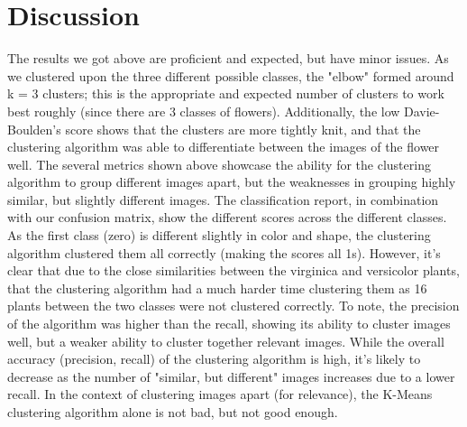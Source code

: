 \documentclass[10pt,twocolumn]{article}
\begin{document}
\section {Discussion}



The results we got above are proficient and expected, but have minor issues. As we clustered upon the three different possible classes, the "elbow" formed around k = 3 clusters; this is the appropriate and expected number of clusters to work best roughly (since there are 3 classes of flowers). Additionally, the low Davie-Boulden's score shows that the clusters are more tightly knit, and that the clustering algorithm was able to differentiate between the images of the flower well. The several metrics shown above showcase the ability for the clustering algorithm to group different images apart, but the weaknesses in grouping highly similar, but slightly different images. The classification report, in combination with our confusion matrix, show the different scores across the different classes. As the first class (zero) is different slightly in color and shape, the clustering algorithm clustered them all correctly (making the scores all 1s). However, it's clear that due to the close similarities between the virginica and versicolor plants, that the clustering algorithm had a much harder time clustering them as 16 plants between the two classes were not clustered correctly. To note, the precision of the algorithm was higher than the recall, showing its ability to cluster images well, but a weaker ability to cluster together relevant images. While the overall accuracy (precision, recall) of the clustering algorithm is high, it's likely to decrease as the number of "similar, but different" images increases due to a lower recall. In the context of clustering images apart (for relevance), the K-Means clustering algorithm alone is not bad, but not good enough.

\end{document}

